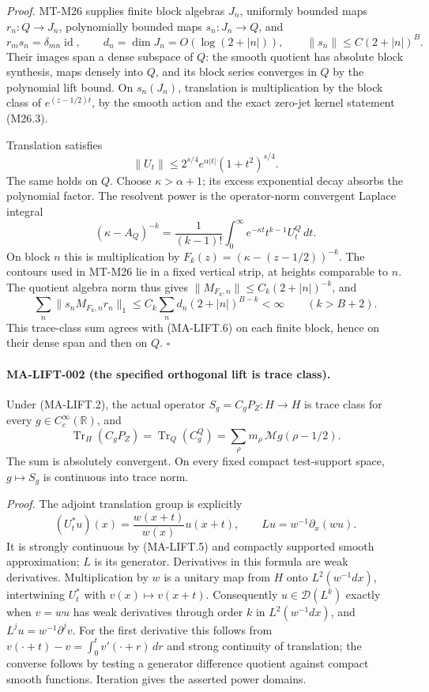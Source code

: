 \emph{Proof.}
MT-M26 supplies finite block algebras $J_n$, uniformly bounded
maps $r_n:Q\to J_n$, polynomially bounded maps $s_n:J_n\to Q$, and
\[
 r_m s_n=\delta_{mn}\operatorname{id},\qquad
 d_n=\dim J_n=O(\log(2+|n|)),\qquad
 \|s_n\|\le C(2+|n|)^B.
 \tag{MA-LIFT.4}
\]
Their images span a dense subspace of $Q$: the smooth quotient has
absolute block synthesis, maps densely into $Q$, and its block
series converges in $Q$ by the polynomial lift bound. On
$s_n(J_n)$, translation is multiplication by the block class of
$e^{(z-1/2)t}$, by the smooth action and the exact zero-jet kernel
statement (M26.3).

Translation satisfies
\[
 \|U_t\|\le 2^{s/4}e^{\alpha|t|}(1+t^2)^{s/4}.
 \tag{MA-LIFT.5}
\]
The same holds on $Q$. Choose $\kappa>\alpha+1$; its excess
exponential decay absorbs the polynomial factor. The resolvent
power is the operator-norm convergent Laplace integral
\[
 (\kappa-A_Q)^{-k}=\frac1{(k-1)!}
 \int_0^\infty e^{-\kappa t}t^{k-1}U_t^Q\,dt.
 \tag{MA-LIFT.6}
\]
On block $n$ this is multiplication by
$F_k(z)=(\kappa-(z-1/2))^{-k}$. The contours used in MT-M26
lie in a fixed vertical strip, at heights comparable to $n$.
The quotient algebra norm thus gives
$\|M_{F_k,n}\|\le C_k(2+|n|)^{-k}$, and
\[
 \sum_n\|s_nM_{F_k,n}r_n\|_1
 \le C_k\sum_n d_n(2+|n|)^{B-k}<\infty\qquad(k>B+2).
 \tag{MA-LIFT.7}
\]
This trace-class sum agrees with (MA-LIFT.6) on each finite
block, hence on their dense span and then on $Q$.
\hfill$\square$

\paragraph{MA-LIFT-002 (the specified orthogonal lift is trace class).}
Under (MA-LIFT.2), the actual operator $S_g=C_gP_Z:H\to H$
is trace class for every $g\in C_c^\infty(\mathbb R)$, and
\[
 \operatorname{Tr}_H(C_gP_Z)
 =\operatorname{Tr}_Q(C_g^Q)
 =\sum_\rho m_\rho\,\mathcal Mg(\rho-1/2).
 \tag{MA-LIFT.8}
\]
The sum is absolutely convergent. On every fixed compact
test-support space, $g\mapsto S_g$ is continuous into trace norm.

\emph{Proof.}
The adjoint translation group is explicitly
\[
 (U_t^*u)(x)=\frac{w(x+t)}{w(x)}u(x+t),\qquad
 Lu=w^{-1}\partial_x(wu).
 \tag{MA-LIFT.9}
\]
It is strongly continuous by (MA-LIFT.5) and compactly supported
smooth approximation; $L$ is its generator. Derivatives in this
formula are weak derivatives. Multiplication by $w$ is a unitary
map from $H$ onto $L^2(w^{-1}dx)$, intertwining $U_t^*$ with
$v(x)\mapsto v(x+t)$. Consequently $u\in\mathcal D(L^k)$ exactly
when $v=wu$ has weak derivatives through order $k$ in
$L^2(w^{-1}dx)$, and $L^ju=w^{-1}\partial^jv$.
For the first derivative this follows from
$v(\cdot+t)-v=\int_0^t v'(\cdot+r)\,dr$ and strong continuity
of translation; the converse follows by testing a generator
difference quotient against compact smooth functions. Iteration
gives the asserted power domains.

